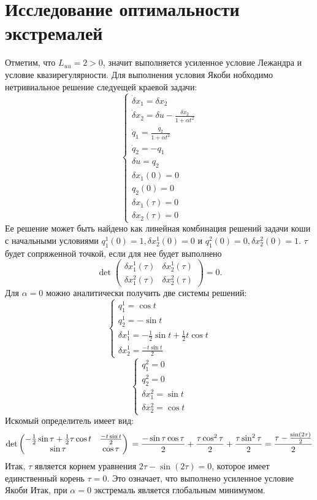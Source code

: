 \documentclass{article}
\begin{document}
\section{Исследование оптимальности экстремалей}
Отметим, что $L_{uu} = 2 > 0$, значит выполняется усиленное условие
Лежандра и условие
квазирегулярности.
Для выполнения условия Якоби нобходимо нетривиальное решение
следуещей краевой задачи:
\[
  \begin{cases}
    \dot\delta x_{1} = \delta x_{2}\\
    \dot\delta x_{2} = \delta u - \frac{\delta x_{2}}{1 + \alpha t^{2}}\\
    \dot q_{1} = \frac{q_{2}}{1 + \alpha t^{2}}\\
    \dot q_{2} = -q_{1}\\
    \delta u = q_{2} \\
    \delta x_{1}(0) = 0\\
    q_{2}(0) = 0\\
    \delta x_{1}(\tau) = 0\\
    \delta x_{2}(\tau) = 0
  \end{cases}
\]
Ее решение может быть найдено как линейная комбинация решений задачи
коши с начальными условиями
$q^{1}_{1}(0) = 1, \delta x^{1}_{2}(0) = 0$ и $q^{2}_{1}(0) = 0,
\delta x^{2}_{2}(0) = 1$. $\tau$ будет сопряженной точкой, если для
нее будет выполнено
\[\det
  \begin{pmatrix}
    \delta x^{1}_{1}(\tau) &\delta x^{1}_{2}(\tau)\\
    \delta x^{2}_{1}(\tau) &\delta x^{2}_{2}(\tau)
  \end{pmatrix} = 0.
\]
Для $\alpha = 0$ можно аналитически получить две системы решений:
\[
  \begin{cases}
    q^{1}_{1} = \cos t\\
    q^{1}_{2} = -\sin t\\
    \delta x^{1}_{1} = -\frac 1 2 \sin t + \frac 1 2 t\cos t\\
    \delta x^{1}_{2} = \frac{-t\sin t}2
  \end{cases}
\]
\[
  \begin{cases}
    q^{2}_{1} = 0\\
    q^{2}_{2} = 0\\
    \delta x^{2}_{1} = \sin t\\
    \delta x^{2}_{2} = \cos t
  \end{cases}
\]
Искомый определитель имеет вид:
\[
  \det
  \begin{pmatrix}
    -\frac 1 2 \sin \tau + \frac 1 2 \tau\cos t &\frac{-t\sin t}{2}\\
    \sin \tau &\cos \tau
  \end{pmatrix} \\= \frac{-\sin \tau \cos \tau}{2} +
  \frac{\tau\cos^{2} \tau}{2} + \frac{\tau\sin^{2}\tau}{2} =
  \frac{\tau - \frac {\sin(2\tau)}2}{2}
\]
Итак, $\tau$ является корнем уравнения $2\tau - \sin(2\tau) = 0$,
которое имеет единственный корень $\tau = 0$.
Это означает, что выполнено усиленное условие Якоби
Итак, при $\alpha = 0$ экстремаль является глобальным минимумом.
\end{document}
